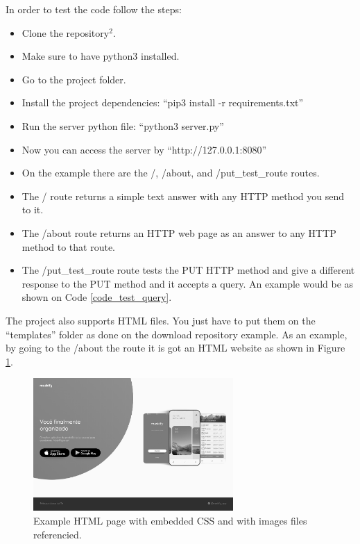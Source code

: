 \documentclass[journal,12pt,onecolumn,draftclsnofoot,]{IEEEtran}
\begin{document}
In order to test the code follow the steps:
\begin{itemize}
    \item Clone the repository$^2$.
    \item Make sure to have python3 installed.
    \item Go to the project folder.
    \item Install the project dependencies: ``pip3 install -r requirements.txt''
    \item Run the server python file: ``python3 server.py''
    \item Now you can access the server by ``http://127.0.0.1:8080''
    \item On the example there are the /, /about, and /put\_test\_route routes.
    \item The / route returns a simple text answer with any HTTP method you send to it.
    \item The /about route returns an HTTP web page as an answer to any HTTP method to that route.
    \item The /put\_test\_route route tests the PUT HTTP method and give a different response to the PUT method and it accepts a query. An example would be as shown on Code \ref{code_test_query}.
\end{itemize}

The project also supports HTML files. You just have to put them on the ``templates'' folder as done on the download repository example. As an example, by going to the /about the route it is got an HTML website as shown in Figure \ref{fig_site}.

\begin{figure}
  \begin{center}
  \includegraphics[width=3.0in]{./imgs/example_page.png}
  \caption{Example HTML page with embedded CSS and with images files referencied.}
  \label{fig_site}
  \end{center}
\end{figure}
\end{document}
